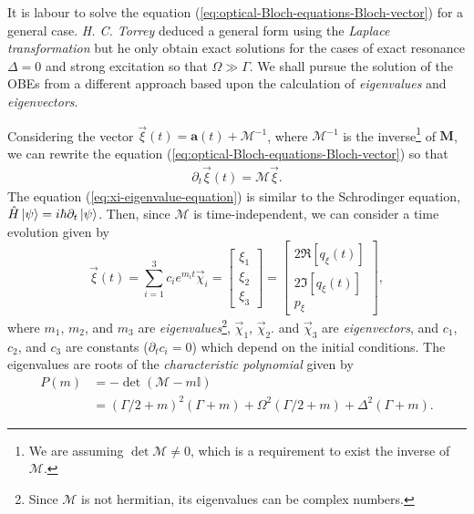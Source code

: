 It is labour to solve the equation (\ref{eq:optical-Bloch-equations-Bloch-vector}) for a general case. \textit{H. C. Torrey} \cite{torrey1949transient} deduced a general form using the \textit{Laplace transformation} but he only obtain exact solutions for the cases of exact resonance $ \Delta = 0 $ and strong excitation so that $ \Omega \gg \Gamma $. We shall pursue the solution of the OBEs from a different approach based upon the calculation of \textit{eigenvalues} and \textit{eigenvectors}.

Considering the vector $ \vec{\xi}(t) = \mathbf{a}(t) + \mathcal{M}^{-1} $, where $ \mathcal{M}^{-1} $ is the inverse\footnote{We are assuming $ \det\mathcal{M} \neq 0 $, which is a requirement to exist the inverse of $ \mathcal{M} $.} of $ \mathbf{M} $, we can rewrite the equation (\ref{eq:optical-Bloch-equations-Bloch-vector}) so that
\begin{gather}
	\partial_t \vec{\xi}(t) = \mathcal{M} \vec{\xi}.
	\label{eq:xi-eigenvalue-equation}
\end{gather}
The equation (\ref{eq:xi-eigenvalue-equation}) is similar to the Schrodinger equation, $ \hat{H}\ket{\psi} = i \hbar \partial_t \ket{\psi} $. Then, since $ \mathcal{M} $ is time-independent, we can consider a time evolution given by
\begin{equation}
	\vec{\xi}(t) = \sum_{i = 1}^{3} c_i e^{m_i t} \vec{\chi}_i = \left[ \begin{matrix} \xi_1 \\ \xi_2 \\ \xi_3 \end{matrix} \right] = \left[ \begin{matrix} 2\Re[q_{\xi}(t)] \\ 2\Im[q_{\xi}(t)] \\ p_{\xi} \end{matrix} \right],
	\label{eq:superposition-Bloch-vector-2}
\end{equation}
where $ m_1 $, $ m_2 $, and $ m_3 $ are \textit{eigenvalues}\footnote{Since $ \mathcal{M} $ is not hermitian, its eigenvalues can be complex numbers.}, $ \vec{\chi}_1 $, $ \vec{\chi}_2 $. and $ \vec{\chi}_3 $ are \textit{eigenvectors}, and $ c_1 $, $ c_2 $, and $ c_3 $ are constants ($ \partial_t c_i = 0 $) which depend on the initial conditions. The eigenvalues are roots of the \textit{characteristic polynomial} given by
\begin{align}
	P(m) &= -\det(\mathcal{M} - m\mathbb{I}) \\
	&= (\Gamma/2 + m)^2 (\Gamma + m) + \Omega^2(\Gamma/2 + m) + \Delta^2 (\Gamma + m).
	\label{eq:characteristic-polynomial}
\end{align}
